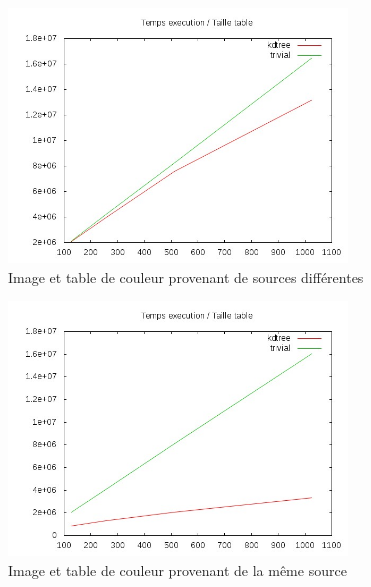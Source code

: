 \documentclass[a4paper,11pt,final]{article}
\begin{document}
\begin{figure}[!ht]
    \centering
    \includegraphics[width=90mm]{./pic/graphexec-dif.jpg}
    \caption{Image et table de couleur provenant de sources différentes}
\end{figure}

\begin{figure}[!ht]
    \centering
    \includegraphics[width=90mm]{./pic/graphexec-meme.jpg}
    \caption{Image et table de couleur provenant de la même source}
\end{figure}
\end{document}
